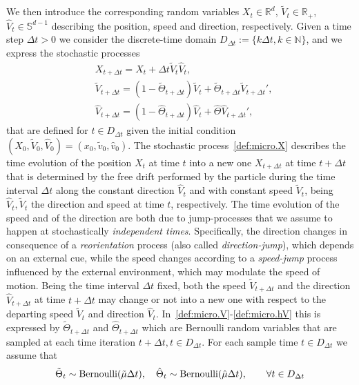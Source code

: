 \documentclass[a4paper]{article}
\theoremstyle{Theorem}\newtheorem{proposition}{Proposition}[section]
\theoremstyle{Remark}\newtheorem{remark}{Remark}[section]
\theoremstyle{Theorem}\newtheorem{theorem}{Theorem}[section]
\newcommand{\R}{\mathbb{R}}
\newcommand{\hv}{\hat{v}}
\newcommand{\tv}{\tilde{v}}
\newcommand{\hV}{\hat{V}}
\newcommand{\tV}{\tilde{V}}
\newcommand{\hmu}{\hat{\mu}}
\newcommand{\tmu}{\tilde{\mu}}
\begin{document}
We then introduce the corresponding random variables $X_t \in \R^d $, $ \tV_t \in \R_+$, $\hV_t \in \mathbb{S}^{d-1} $ describing the position, speed and direction, respectively. Given a time step $\Delta t >0$ we consider the discrete-time domain $D_{\Delta t}:=\lbrace k\Delta t, k\in \mathbb{N}\rbrace$, and we express the stochastic processes 
\begin{align}
&X_{t+\Delta t}=X_t+\Delta t \tV_t \hV_t,\label{def:micro.X}\\[0.2cm]
&\tV_{t+\Delta t}=(1-\tilde{\Theta}_{t+\Delta t}) \tV_t+\tilde{\Theta}_{t+\Delta t}\tV_{t+\Delta t}',\label{def:micro.V}\\[0.2cm]
&\hV_{t+\Delta t}=(1-\hat{\Theta}_{t+\Delta t})\hV_t+\hat{\Theta} \hV_{t+\Delta t}',\label{def:micro.hV}
\end{align}
that are defined for $t\in D_{\Delta t}$ given the initial condition $(X_0,\tV_0,\hV_0)=(x_0,\tv_0,\hv_0)$. The stochastic process~\eqref{def:micro.X} describes the time evolution of the position $X_t$ at time $t$ into a new one $X_{t+\Delta t}$ at time $t+\Delta t$ that is determined by the free drift performed by the particle during the time interval $\Delta t$ along the constant direction $\hV_t$ and with constant speed $ \tV_t$, being $\hV_t, \tV_t$ the direction and speed at time $t$, respectively. The time evolution of the speed and of the direction are both due to jump-processes that we assume to happen at stochastically \textit{independent times}. Specifically, the direction changes in consequence of a \textit{reorientation} process (also called \textit{direction-jump}), which depends on an external cue, while the speed changes according to a \textit{speed-jump} process influenced by the external environment, which may modulate the speed of motion. Being the time interval $\Delta t$ fixed, both the speed $\tV_{t+\Delta t}$ and the direction $\hV_{t+\Delta t}$ at time $t+\Delta t$ may change or not into a new one with respect to the departing speed $ \tV_t$ and direction $\hV_t$. In~\eqref{def:micro.V}-\eqref{def:micro.hV} this is expressed by $\tilde{\Theta}_{t+\Delta t}$ and $\hat{\Theta}_{t+\Delta t}$ which are Bernoulli random variables that are sampled at each time iteration $t+\Delta t, t\in D_{\Delta t}$. For each sample time $t \in D_{\Delta t}$ we assume that
\begin{equation}\label{def:Berny}
\tilde{\Theta}_t \sim {\rm Bernoulli} ( \tmu \Delta t), \quad \hat{\Theta}_t \sim {\rm Bernoulli} (\hmu \Delta t), \qquad \forall t \in D_{\Delta t}
\end{equation} 
\end{document}
